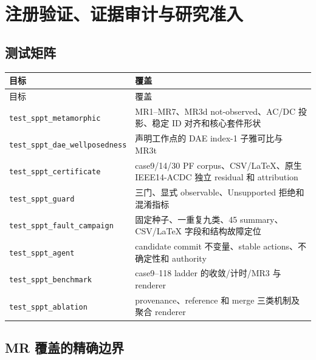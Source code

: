 \section{注册验证、证据审计与研究准入}

\subsection{测试矩阵}

\begin{center}\footnotesize
\begin{longtable}{@{}L{4.5cm}L{10.7cm}@{}}
\toprule 目标 & 覆盖\\\midrule
\endfirsthead
\toprule 目标 & 覆盖\\\midrule\endhead
\texttt{test\_sppt\_metamorphic} & MR1--MR7、MR3d not-observed、AC/DC 投影、稳定 ID 对齐和核心套件形状\\
\texttt{test\_sppt\_dae\_wellposedness} & 声明工作点的 DAE index-1 子雅可比与 MR3t\\
\texttt{test\_sppt\_certificate} & case9/14/30 PF corpus、CSV/LaTeX、原生 IEEE14-ACDC 独立 residual 和 attribution\\
\texttt{test\_sppt\_guard} & 三门、显式 observable、Unsupported 拒绝和混淆指标\\
\texttt{test\_sppt\_fault\_campaign} & 固定种子、一重复九类、45 summary、CSV/LaTeX 字段和结构故障定位\\
\texttt{test\_sppt\_agent} & candidate commit 不变量、stable actions、不确定性和 authority\\
\texttt{test\_sppt\_benchmark} & case9--118 ladder 的收敛/计时/MR3 与 renderer\\
\texttt{test\_sppt\_ablation} & provenance、reference 和 merge 三类机制及聚合 renderer\\
\bottomrule
\end{longtable}
\end{center}

\subsection{MR 覆盖的精确边界}

